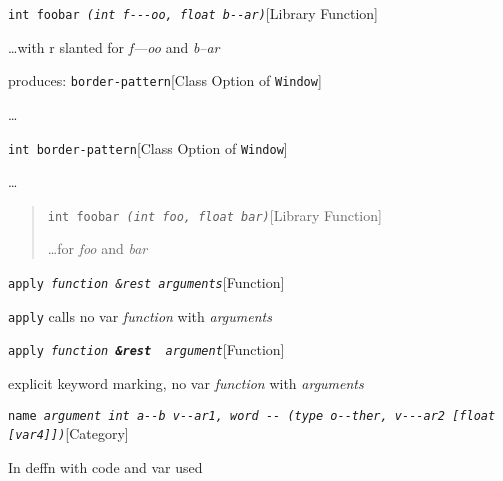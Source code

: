 \documentclass{book}
\begin{document}
\noindent\texttt{int foobar \EmbracOn{}\textsl{(int \EmbracOff{}\textnormal{\textsl{f{-}{-}{-}oo}}\EmbracOn{}, float \EmbracOff{}\textnormal{\textsl{b{-}{-}ar}}\EmbracOn{})}}\hfill[Library Function]



%
\dots{}\@ with r slanted for \textsl{f---oo} and \textsl{b--ar}

\noindent{}produces:
\noindent\texttt{border-pattern}\hfill[Class Option of \texttt{Window}]



%
\dots{}\@

\noindent\texttt{\texttt{int} border-pattern}\hfill[Class Option of \texttt{Window}]



%
\dots{}\@

\begin{quote}
\noindent\texttt{int foobar \EmbracOn{}\textsl{(int \EmbracOff{}\textsl{foo}\EmbracOn{}, float \EmbracOff{}\textsl{bar}\EmbracOn{})}}\hfill[Library Function]



%
\dots{}\@ for \textsl{foo} and \textsl{bar}
\end{quote}

\noindent\texttt{apply \EmbracOn{}\textsl{function \&rest arguments}}\hfill[Function]



%
\texttt{apply} calls no var \textsl{function} with \textsl{arguments}

\noindent\texttt{apply \EmbracOn{}\textsl{function \EmbracOff{}\textnormal{\textbf{\&rest }}\EmbracOn{} argument}}\hfill[Function]



%
explicit keyword marking, no var \textsl{function} with \textsl{arguments}

\noindent\texttt{name \EmbracOn{}\textsl{argument \EmbracOff{}\texttt{int}\EmbracOn{} \EmbracOff{}\texttt{a{-}{-}b}\EmbracOn{} \EmbracOff{}\textsl{v{-}{-}ar1}\EmbracOn{}, word \EmbracOff{}\texttt{{-}{-}}\EmbracOn{} (\EmbracOff{}\texttt{type o{-}{-}ther}\EmbracOn{}, \EmbracOff{}\textsl{v{-}{-}{-}ar2}\EmbracOn{}  [\EmbracOff{}\texttt{float}\EmbracOn{} [\EmbracOff{}\textsl{var4}\EmbracOn{}]])}}\hfill[Category]



%
In deffn with code and var used
\end{document}
